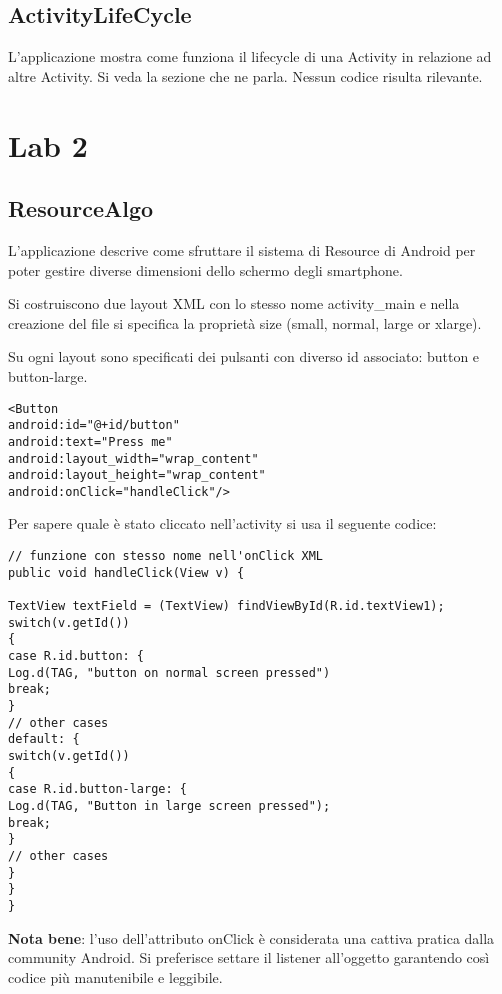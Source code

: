 \subsection{ActivityLifeCycle}
L'applicazione mostra come funziona il lifecycle di una Activity in relazione ad altre Activity. Si veda la sezione che ne parla. Nessun codice risulta rilevante.


\section{Lab 2}

\subsection{ResourceAlgo}
L'applicazione descrive come sfruttare il sistema di Resource di Android per poter gestire diverse dimensioni dello schermo degli smartphone.

Si costruiscono due layout XML con lo stesso nome activity_main e nella creazione del file si specifica la proprietà size (small, normal, large or xlarge).

Su ogni layout sono specificati dei pulsanti con diverso id associato: button e button-large.
\begin{lstlisting}
<Button
android:id="@+id/button"
android:text="Press me"
android:layout_width="wrap_content"
android:layout_height="wrap_content"
android:onClick="handleClick"/>
\end{lstlisting}

Per sapere quale è stato cliccato nell'activity si usa il seguente codice:
\begin{lstlisting}
// funzione con stesso nome nell'onClick XML
public void handleClick(View v) {

TextView textField = (TextView) findViewById(R.id.textView1);
switch(v.getId())
{
case R.id.button: {
Log.d(TAG, "button on normal screen pressed")
break;
}
// other cases
default: {
switch(v.getId())
{
case R.id.button-large: {
Log.d(TAG, "Button in large screen pressed");
break;
}
// other cases
}
}
}
\end{lstlisting}

\textbf{Nota bene}: l'uso dell'attributo onClick è considerata una cattiva pratica dalla community Android. Si preferisce settare il listener all'oggetto garantendo così codice più manutenibile e leggibile.

